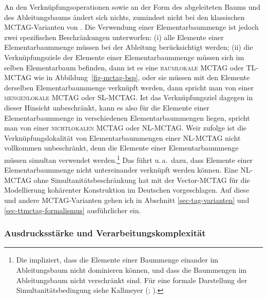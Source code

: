 An den Verknüpfungsoperationen sowie an der Form des abgeleiteten Baums und des Ableitungsbaums ändert sich nichts, zumindest nicht bei den klassischen MCTAG-Varianten von \cite{Weir:88}. Die Verwendung einer Elementarbaummenge ist jedoch zwei spezifischen Beschränkungen unterworfen: (i) alle Elemente einer Elementarbaummenge müssen bei der Ableitung berücksichtigt werden; (ii) die Verknüpfungsziele der Elemente einer Elementarbaummenge müssen sich im selben  Elementarbaum befinden, dann ist es eine \textsc{baumlokale MCTAG} oder \textsc{TL-MCTAG} wie in Abbildung~\ref{fig-mctag-bsp}, oder sie müssen mit den Elemente derselben Elementarbaummenge verknüpft werden, dann spricht man von einer \textsc{mengenlokale MCTAG} oder \textsc{SL-MCTAG}. Ist das Verknüpfungsziel dagegen in dieser Hinsicht unbeschränkt, kann es also für die Elemente einer Elementarbaummenge in verschiedenen Elementarbaummengen liegen, spricht man von einer \textsc{nichtlokalen MCTAG} oder \textsc{NL-MCTAG}. Weir zufolge ist die Verknüpfungslokalität von Elementarbaummengen einer NL-MCTAG nicht vollkommen unbeschränkt, denn die Elemente einer Elementar\-baummenge müssen simultan verwendet werden.\footnote{Die  impliziert, dass die Elemente einer Baummenge einander im Ableitungsbaum nicht dominieren können, und dass die Baummengen im Ableitungsbaum nicht verschränkt sind. Für eine formale Darstellung der Simultanitätsbedingung siehe Kallmeyer (\citeyear[197]{Kallmeyer:05}; \citeyear[65f]{Kallmeyer:09}).} Das führt u.\,a.\ dazu, dass Elemente einer Elementarbaummenge nicht untereinander verknüpft werden können. Eine NL-MCTAG ohne Simultanitätsbeschränkung hat \cite{Rambow:94} mit der Vector-MCTAG für die Modellierung kohärenter Konstruktion im Deutschen vorgeschlagen. Auf diese und andere MCTAG-Varianten gehen ich in Abschnitt \ref{sec-tag-varianten} und \ref{sec-ttmctag-formalismus} ausführlicher ein. 

\subsubsection*{Ausdrucksstärke und Verarbeitungskomplexität}

